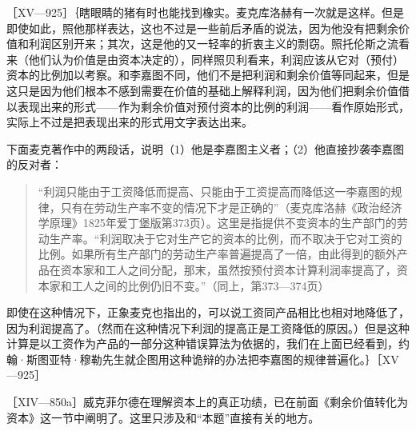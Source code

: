
［XV—925］｛瞎眼睛的猪有时也能找到橡实。麦克库洛赫有一次就是这样。但是即使如此，照他那样表达，这也不过是一些前后矛盾的说法，因为他没有把剩余价值和利润区别开来；其次，这是他的又一轻率的折衷主义的剽窃。照托伦斯之流看来（他们认为价值是由资本决定的），同样照贝利看来，利润应该从它对（预付）资本的比例加以考察。和李嘉图不同，他们不是把利润和剩余价值等同起来，但是这只是因为他们根本不感到需要在价值的基础上解释利润，因为他们把剩余价值借以表现出来的形式——作为剩余价值对预付资本的比例的利润——看作原始形式，实际上不过是把表现出来的形式用文字表达出来。

下面麦克著作中的两段话，说明（1）他是李嘉图主义者；（2）他直接抄袭李嘉图的反对者：

\begin{quote}{“利润只能由于工资降低而提高、只能由于工资提高而降低这一李嘉图的规律，只有在劳动生产率不变的情况下才是正确的”（麦克库洛赫《政治经济学原理》1825年爱丁堡版第373页）。这里是指提供不变资本的生产部门的劳动生产率。“利润取决于它对生产它的资本的比例，而不取决于它对工资的比例。如果所有生产部门的劳动生产率普遍提高了一倍，由此得到的额外产品在资本家和工人之间分配，那末，虽然按预付资本计算利润率提高了，资本家和工人之间的比例仍旧不变。”（同上，第373—374页）}\end{quote}

即使在这种情况下，正象麦克也指出的，可以说工资同产品相比也相对地降低了，因为利润提高了。（然而在这种情况下利润的提高正是工资降低的原因。）但是这种计算是以工资作为产品的一部分这种错误算法为依据的，我们在上面已经看到，约翰·斯图亚特·穆勒先生就企图用这种诡辩的办法把李嘉图的规律普遍化。｝［XV—925］


［XIV—850a］威克菲尔德在理解资本上的真正功绩，已在前面《剩余价值转化为资本》这一节中阐明了。这里只涉及和“本题”直接有关的地方。

